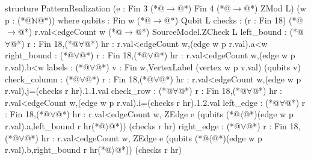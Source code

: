 structure PatternRealization (e : Fin 3 (*@$\to$@*) Fin 4 (*@$\to$@*) ZMod L) (w p : (*@$\mathbb N$@*)) where
  qubits : Fin w (*@$\to$@*) Qubit L
  checks : (r : Fin 18) (*@$\to$@*) r.val<edgeCount w (*@$\to$@*) SourceModel.ZCheck L
  left_bound : (*@$\forall$@*) r : Fin 18,(*@$\forall$@*) hr : r.val<edgeCount w,(edge w p r.val).a<w
  right_bound : (*@$\forall$@*) r : Fin 18,(*@$\forall$@*) hr : r.val<edgeCount w,(edge w p r.val).b<w
  labels : (*@$\forall$@*) v : Fin w,VertexLabel (vertex w p v.val) (qubits v)
  check_column : (*@$\forall$@*) r : Fin 18,(*@$\forall$@*) hr : r.val<edgeCount w,(edge w p r.val).j=(checks r hr).1.1.val
  check_row : (*@$\forall$@*) r : Fin 18,(*@$\forall$@*) hr : r.val<edgeCount w,(edge w p r.val).i=(checks r hr).1.2.val
  left_edge : (*@$\forall$@*) r : Fin 18,(*@$\forall$@*) hr : r.val<edgeCount w,
    ZEdge e (qubits (*@$\langle$@*)(edge w p r.val).a,left_bound r hr(*@$\rangle$@*)) (checks r hr)
  right_edge : (*@$\forall$@*) r : Fin 18,(*@$\forall$@*) hr : r.val<edgeCount w,
    ZEdge e (qubits (*@$\langle$@*)(edge w p r.val).b,right_bound r hr(*@$\rangle$@*)) (checks r hr)
